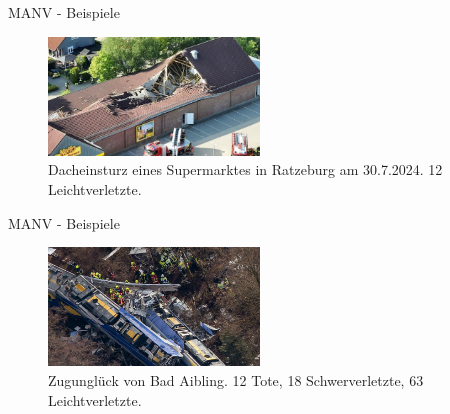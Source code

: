 \begin{frame}{MANV - Beispiele}
	\begin{examples}
		\begin{figure}
			\begin{center}
				\includegraphics[width=0.5\textwidth]{images/ratzeburg-netto.jpg}
			\end{center}
			\caption{Dacheinsturz eines Supermarktes in Ratzeburg am 30.7.2024. 12 Leichtverletzte.\cite{manv-ratzeburg}}\label{fig:netto}
		\end{figure}
	\end{examples}
\end{frame}

\begin{frame}{MANV - Beispiele}
	\begin{examples}
		\begin{figure}
			\begin{center}
				\includegraphics[width=0.5\textwidth]{images/bad-aibling.jpg}
			\end{center}
			\caption{Zugunglück von Bad Aibling. 12 Tote, 18 Schwerverletzte, 63 Leichtverletzte.\cite{manv-badaibling}}\label{fig:badaibling}
		\end{figure}
	\end{examples}
\end{frame}


